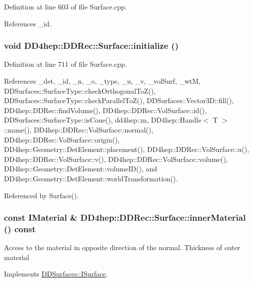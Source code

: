 Definition at line 603 of file Surface.cpp.

References \_\-id.\hypertarget{class_d_d4hep_1_1_d_d_rec_1_1_surface_aeee7cc15facd37699acda7146f540fe1}{
\subsubsection[{initialize}]{\setlength{\rightskip}{0pt plus 5cm}void DD4hep::DDRec::Surface::initialize ()}}
\label{class_d_d4hep_1_1_d_d_rec_1_1_surface_aeee7cc15facd37699acda7146f540fe1}


Definition at line 711 of file Surface.cpp.

References \_\-det, \_\-id, \_\-n, \_\-o, \_\-type, \_\-u, \_\-v, \_\-volSurf, \_\-wtM, DDSurfaces::SurfaceType::checkOrthogonalToZ(), DDSurfaces::SurfaceType::checkParallelToZ(), DDSurfaces::Vector3D::fill(), DD4hep::DDRec::findVolume(), DD4hep::DDRec::VolSurface::id(), DDSurfaces::SurfaceType::isCone(), dd4hep::m, DD4hep::Handle$<$ T $>$::name(), DD4hep::DDRec::VolSurface::normal(), DD4hep::DDRec::VolSurface::origin(), DD4hep::Geometry::DetElement::placement(), DD4hep::DDRec::VolSurface::u(), DD4hep::DDRec::VolSurface::v(), DD4hep::DDRec::VolSurface::volume(), DD4hep::Geometry::DetElement::volumeID(), and DD4hep::Geometry::DetElement::worldTransformation().

Referenced by Surface().\hypertarget{class_d_d4hep_1_1_d_d_rec_1_1_surface_a923794ef06f1fb5364e68f60b99b7159}{
\subsubsection[{innerMaterial}]{\setlength{\rightskip}{0pt plus 5cm}const {\bf IMaterial} \& DD4hep::DDRec::Surface::innerMaterial () const}}
\label{class_d_d4hep_1_1_d_d_rec_1_1_surface_a923794ef06f1fb5364e68f60b99b7159}


Access to the material in opposite direction of the normal. Thickness of outer material 

Implements \hyperlink{class_d_d_surfaces_1_1_i_surface_a18942d2f0ea7478506765a50fa44d5e3}{DDSurfaces::ISurface}.

